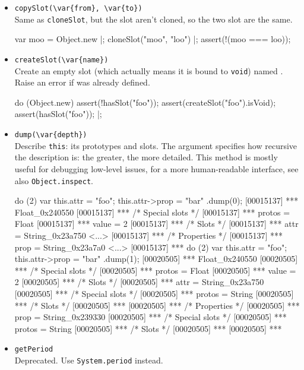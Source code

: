\begin{itemize}
\item \lstinline|copySlot(\var{from}, \var{to})|\\
  Same as \lstinline|cloneSlot|, but the slot aren't cloned, so the
  two slot are the same.
\begin{urbiscript}
var moo = Object.new |;
cloneSlot("moo", "loo") |;
assert(!(moo === loo));
\end{urbiscript}

\item \lstinline|createSlot(\var{name})|\\
  Create an empty slot (which actually means it is bound to
  \lstinline|void|) named .  Raise an error if 
  was already defined.
\begin{urbiscript}
do (Object.new)
{
  assert(!hasSlot("foo"));
  assert(createSlot("foo").isVoid);
  assert(hasSlot("foo"));
}|;
\end{urbiscript}

\item \lstinline|dump(\var{depth})|\\
  Describe \lstinline|this|: its prototypes and slots.  The argument
   specifies how recursive the description is: the greater,
  the more detailed.  This method is mostly useful for debugging
  low-level issues, for a more human-readable interface, see also
  \lstinline|Object.inspect|.
\begin{urbiscript}
do (2) { var this.attr = "foo"; this.attr->prop = "bar" }.dump(0);
[00015137] *** Float_0x240550 {
[00015137] ***   /* Special slots */
[00015137] ***   protos = Float
[00015137] ***   value = 2
[00015137] ***   /* Slots */
[00015137] ***   attr = String_0x23a750 <...>
[00015137] ***     /* Properties */
[00015137] ***     prop = String_0x23a7a0 <...>
[00015137] ***   }
do (2) { var this.attr = "foo"; this.attr->prop = "bar" }.dump(1);
[00020505] *** Float_0x240550 {
[00020505] ***   /* Special slots */
[00020505] ***   protos = Float
[00020505] ***   value = 2
[00020505] ***   /* Slots */
[00020505] ***   attr = String_0x23a750 {
[00020505] ***     /* Special slots */
[00020505] ***     protos = String
[00020505] ***     /* Slots */
[00020505] ***     }
[00020505] ***     /* Properties */
[00020505] ***     prop = String_0x239330 {
[00020505] ***       /* Special slots */
[00020505] ***       protos = String
[00020505] ***       /* Slots */
[00020505] ***       }
[00020505] ***   }
\end{urbiscript}

\item \lstinline|getPeriod|\\
  Deprecated.  Use \lstinline|System.period| instead.


\end{itemize}
